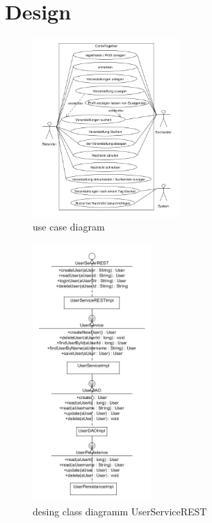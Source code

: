 \section{Design}\label{Design}


\begin{figure}[htp]
\centering
\includegraphics[width=0.5\textwidth]{Ingo/pictures/UseCaseDiagram.png}
\caption{use case diagram}
\label{fig:useCaseDiagram}
\end{figure}


\begin{figure}[htp]
\centering
\includegraphics[width=0.4\textwidth]{Ingo/pictures/Design_User.png}
\caption{desing class diagramm UserServiceREST}
\label{fig:UserServiceREST}
\end{figure}

